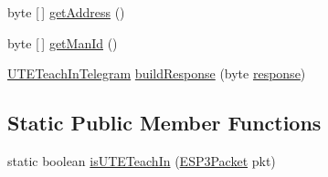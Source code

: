 \begin{DoxyCompactItemize}
\item 
byte \mbox{[}$\,$\mbox{]} \hyperlink{classit_1_1polito_1_1elite_1_1enocean_1_1enj_1_1eep_1_1eep26_1_1telegram_1_1_u_t_e_teach_in_telegram_ad14f47f2bdfc81314bc1ce6a637e16ca}{get\+Address} ()
\item 
byte \mbox{[}$\,$\mbox{]} \hyperlink{classit_1_1polito_1_1elite_1_1enocean_1_1enj_1_1eep_1_1eep26_1_1telegram_1_1_u_t_e_teach_in_telegram_a2677555c08f3bd599a9eeda35ad00356}{get\+Man\+Id} ()
\item 
\hyperlink{classit_1_1polito_1_1elite_1_1enocean_1_1enj_1_1eep_1_1eep26_1_1telegram_1_1_u_t_e_teach_in_telegram}{U\+T\+E\+Teach\+In\+Telegram} \hyperlink{classit_1_1polito_1_1elite_1_1enocean_1_1enj_1_1eep_1_1eep26_1_1telegram_1_1_u_t_e_teach_in_telegram_a16e78fc667d590cb7f1f31b08a5ad7e2}{build\+Response} (byte \hyperlink{classit_1_1polito_1_1elite_1_1enocean_1_1enj_1_1eep_1_1eep26_1_1telegram_1_1_u_t_e_teach_in_telegram_a0cc5ba036863e135e7cfa2d94ab6facf}{response})
\end{DoxyCompactItemize}
\subsection*{Static Public Member Functions}
\begin{DoxyCompactItemize}
\item 
static boolean \hyperlink{classit_1_1polito_1_1elite_1_1enocean_1_1enj_1_1eep_1_1eep26_1_1telegram_1_1_u_t_e_teach_in_telegram_a38e8debb34a336c073fbe6255d1f02b6}{is\+U\+T\+E\+Teach\+In} (\hyperlink{classit_1_1polito_1_1elite_1_1enocean_1_1protocol_1_1serial_1_1v3_1_1network_1_1packet_1_1_e_s_p3_packet}{E\+S\+P3\+Packet} pkt)
\end{DoxyCompactItemize}
